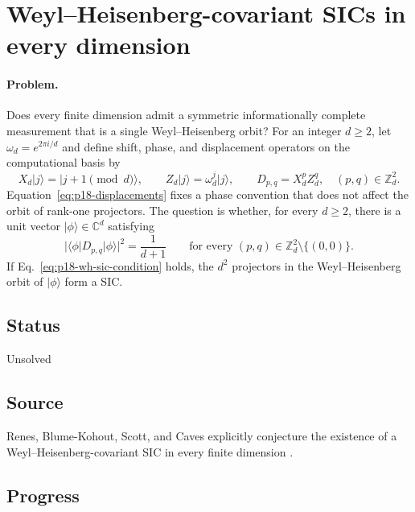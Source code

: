 \section{Weyl--Heisenberg-covariant SICs in every dimension}
\label{sec:problem-18}

\paragraph{Problem.}
Does every finite dimension admit a symmetric informationally complete
measurement that is a single Weyl--Heisenberg orbit?  For an integer $d\geq2$,
let $\omega_d=e^{2\pi i/d}$ and define shift, phase, and displacement operators
on the computational basis by
\begin{equation}
  X_d\lvert j\rangle=\lvert j+1\!\!\pmod d\rangle,
  \qquad
  Z_d\lvert j\rangle=\omega_d^j\lvert j\rangle,
  \qquad
  D_{p,q}=X_d^pZ_d^q,
  \quad (p,q)\in\mathbb Z_d^2.
  \label{eq:p18-displacements}
\end{equation}
Equation~\eqref{eq:p18-displacements} fixes a phase convention that does not
affect the orbit of rank-one projectors.  The question is whether, for every
$d\geq2$, there is a unit vector $\lvert\phi\rangle\in\mathbb C^d$ satisfying
\begin{equation}
  \bigl|\langle\phi\rvert D_{p,q}\lvert\phi\rangle\bigr|^2
  =\frac{1}{d+1}
  \qquad
  \text{for every }(p,q)\in\mathbb Z_d^2\setminus\{(0,0)\}.
  \label{eq:p18-wh-sic-condition}
\end{equation}
If Eq.~\eqref{eq:p18-wh-sic-condition} holds, the $d^2$ projectors in the
Weyl--Heisenberg orbit of $\lvert\phi\rangle$ form a SIC.

\subsection*{Status}

Unsolved

\subsection*{Source}

Renes, Blume-Kohout, Scott, and Caves explicitly conjecture the existence of a
Weyl--Heisenberg-covariant SIC in every finite dimension
.

\subsection*{Progress}

